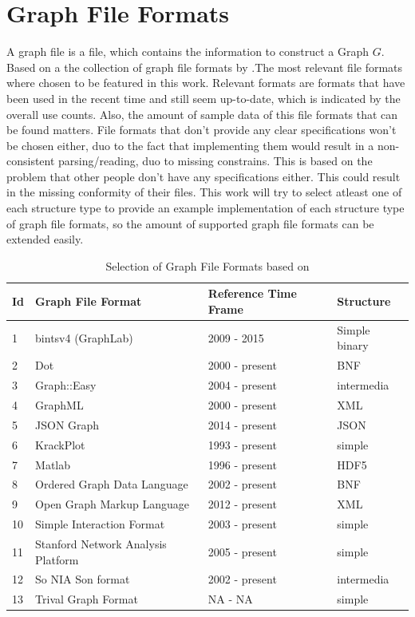 \section{Graph File Formats}
A graph file is a file, which contains the information to construct a Graph $G$.\\
Based on a the collection of graph file formats by \cite{Roughan.10.03.2015}.The most relevant file formats where chosen to be featured in this work. Relevant formats are formats that have been used in the recent time and still seem up-to-date, which is indicated by the overall use counts. Also, the amount of sample data of this file formats that can be found matters. File formats that don’t provide any clear specifications won’t be chosen either, duo to the fact that implementing them would result in a non-consistent parsing/reading, duo to missing constrains. This is based on the problem that other people don't have any specifications either. This could result in the missing conformity of their files. This work will try to select atleast one of each structure type to provide an example implementation of each structure type of graph file formats, so the amount of supported graph file formats can be extended easily.
\begin{table}[H]
\begin{center}
    \begin{tabular}{| l | l | l | l |}
    \hline
	\bfseries Id & \bfseries Graph File Format & \bfseries Reference Time Frame & \bfseries Structure\\ \hline
	1 & bintsv4 (GraphLab) & 2009 - 2015 & Simple binary\\ \hline
	2 & Dot & 2000 - present & BNF\\ \hline
	3 & Graph::Easy & 2004 - present & intermedia\\ \hline
	4 & GraphML & 2000 - present & XML\\ \hline
	5 & JSON Graph & 2014 - present & JSON\\ \hline
	6 & KrackPlot & 1993 - present & simple\\ \hline
	7 & Matlab & 1996 - present & HDF5\\ \hline
	8 & Ordered Graph Data Language & 2002 - present & BNF\\ \hline
	9 & Open Graph Markup Language & 2012 - present & XML\\ \hline
	10 & Simple Interaction Format & 2003 - present & simple\\ \hline
	11 & Stanford Network Analysis Platform & 2005 - present & simple\\ \hline
	12 & So NIA Son format & 2002 - present & intermedia\\ \hline
	13 & Trival Graph Format & NA - NA & simple\\ \hline
    \end{tabular}
\end{center}\caption{Selection of Graph File Formats based on\cite{Roughan.10.03.2015}}
\label{tabelle_avarage_time}
\end{table}

